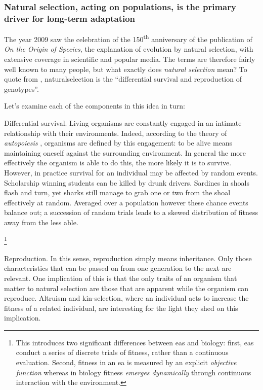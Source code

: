 \subsubsection{Natural selection, acting on populations, is the primary driver for long-term adaptation}
\label{natural-selection-acting-on-populations-is-the-primary-driver-for-long-term-adaptation}

The year 2009 saw the celebration of the 150\textsuperscript{th}
anniversary of the publication of \emph{On the Origin of Species}, the
explanation of evolution by natural selection, with extensive coverage
in scientific and popular media. The terms are therefore fairly well
known to many people, but what exactly does \emph{natural selection}
mean? To quote from \autocite{Futuyama:1979tg}, \gls{naturalselection}
is the ``differential survival and reproduction of genotypes''.

Let's examine each of the components in this idea in turn:

Differential survival. Living organisms are constantly engaged in an
intimate relationship with their environments. Indeed, according to the
theory of \emph{autopoiesis} \autocite{Varela:1974qd}, organisms are
defined by this engagement: to be alive means maintaining oneself
against the surrounding environment. In general the more effectively the
organism is able to do this, the more likely it is to survive. However,
in practice survival for an individual may be affected by random events.
Scholarship winning students can be killed by drunk drivers. Sardines in
shoals flash and turn, yet sharks still manage to grab one or two from
the shoal effectively at random. Averaged over a population however
these chance events balance out; a succession of random trials leads to
a skewed distribution of fitness away from the less able.

\footnote{This introduces two significant differences between \glspl{ea}
	and biology: first, \glspl{ea} conduct a series of discrete trials of fitness,
	rather than a continuous evaluation. Second, fitness in an \gls{ea} is
	measured by an explicit \emph{objective function} whereas in biology
	fitness \emph{emerges dynamically} through continuous interaction with
the environment.}

Reproduction. In this sense, reproduction simply means inheritance. Only
those characteristics that can be passed on from one generation to the
next are relevant. One implication of this is that the only traits of an
organism that matter to natural selection are those that are apparent
while the organism can reproduce. Altruism and kin-selection, where an
individual acts to increase the fitness of a related individual, are
interesting for the light they shed on this implication.

